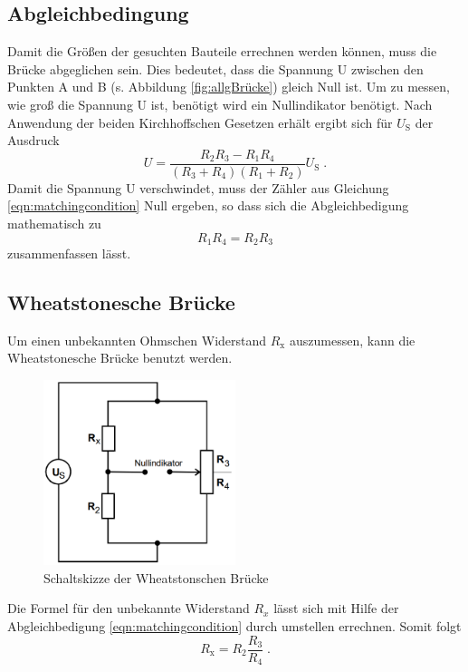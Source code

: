 \subsection{Abgleichbedingung}
Damit die Größen der gesuchten Bauteile errechnen werden können, muss die Brücke abgeglichen sein. Dies bedeutet, dass die Spannung U zwischen den Punkten A und B (s. 
Abbildung \ref{fig:allgBrücke}) gleich Null ist. Um zu messen, wie groß die Spannung U ist, benötigt wird ein Nullindikator benötigt.
Nach Anwendung der beiden Kirchhoffschen Gesetzen erhält ergibt sich für $U_\text{S}$ der Ausdruck  
\begin{equation}
    U = \frac{R_2 R_3 - R_1 R_4}{\left( R_3 + R_4 \right) \left( R_1 + R_2\right)} U_\text{S} \; \text{.} \label{eqn:matchingcondition}
\end{equation}
Damit die Spannung U verschwindet, muss der Zähler aus Gleichung \eqref{eqn:matchingcondition} Null ergeben, so dass sich die Abgleichbedigung mathematisch zu
\begin{equation}
    R_1 R_4 = R_2 R_3 \label{fig:matchingcondition}
\end{equation}
zusammenfassen lässt. 
\subsection{Wheatstonesche Brücke} \label{subsec:Wheat}
Um einen unbekannten Ohmschen Widerstand $R_\text{x}$ auszumessen, kann die Wheatstonesche Brücke benutzt werden. 
\begin{figure}
    \centering
    \caption{Schaltskizze der Wheatstonschen Brücke}
    \label{fig:Wheatstone}
    \includegraphics[width = 0.5\textwidth]{bridges/wheat.png}
\end{figure}
Die Formel für den unbekannte Widerstand $R_x$ lässt sich mit Hilfe der Abgleichbedigung \eqref{eqn:matchingcondition} durch umstellen errechnen. Somit folgt 
\begin{equation}
    R_\text{x} = R_2 \frac{R_3}{R_4} \; \text{.} \label{eqn:wheat}
\end{equation}
